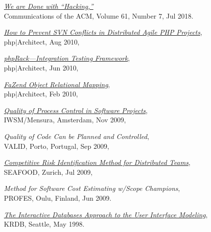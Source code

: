 \documentclass[12pt]{article}
\begin{document}
\emph{\href{https://www.yegor256.com/pdf/2018/we-are-done-with-hacking.pdf}{We are Done with ``Hacking,''}}\\
Communications of the ACM, Volume 61, Number 7, Jul 2018.

\emph{\href{https://www.yegor256.com/pdf/2010/phpArchitect-conflicts.pdf}{How to Prevent SVN Conflicts in Distributed Agile PHP Projects}},\\
php$|$Architect, Aug 2010,

\emph{\href{https://www.yegor256.com/pdf/2010/phpArchitect-phpRack.pdf}{phpRack---Integration Testing Framework}},\\
php$|$Architect, Jun 2010,

\emph{\href{https://www.yegor256.com/pdf/2010/phpArchitect-fazend-orm.pdf}{FaZend Object Relational Mapping}},\\
php$|$Architect, Feb 2010,

\emph{\href{https://www.yegor256.com/pdf/2009/IWSM09-article.pdf}{Quality of Process Control in Software Projects}},\\
IWSM/Mensura, Amsterdam, Nov 2009,

\emph{Quality of Code Can be Planned and Controlled},\\
VALID, Porto, Portugal, Sep 2009,

\emph{\href{https://www.yegor256.com/pdf/2009/SEAFOOD09-article.pdf}{Competitive Risk Identification Method for Distributed Teams}},\\
SEAFOOD, Zurich, Jul 2009,

\emph{Method for Software Cost Estimating w/Scope Champions},\\
PROFES, Oulu, Finland, Jun 2009.

\emph{\href{https://www.yegor256.com/pdf/1998/KRDB98-article.pdf}{The Interactive Databases Approach to the User Interface Modeling}},\\
KRDB, Seattle, May 1998.
\end{document}

